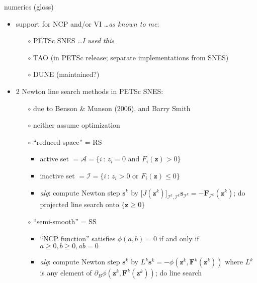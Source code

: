 \documentclass{beamer}
\newcommand\bq{\mathbf{q}}
\newcommand\bs{\mathbf{s}}
\newcommand\bx{\mathbf{x}}
\newcommand\bz{\mathbf{z}}
\newcommand\bF{\mathbf{F}}
\newcommand\Div{\nabla\cdot}
\begin{document}
\begin{frame}{numerics (gloss)}

\begin{itemize}
\item support for NCP and/or VI \dots \emph{as known to me}:
  \begin{itemize}
  \item[$\circ$]  PETSc SNES \dots \emph{I used this}
  \item[$\circ$]  TAO (in PETSc release; separate implementations from SNES)
  \item[$\circ$]  DUNE (maintained?)
  \end{itemize}
\item 2 Newton line search methods in PETSc SNES:
  \begin{itemize}
  \item[$\circ$]  due to Benson \& Munson (2006), and Barry Smith
  \item[$\circ$]  neither assume optimization
  \item[$\circ$]  ``reduced-space'' = \alert{RS}
    \begin{itemize}
    \item active set $= \mathcal{A} = \{i \,:\, z_i = 0 \text{ and } F_i(\bz) > 0\}$
    \item inactive set $= \mathcal{I} = \{i \,:\, z_i > 0 \text{ or } F_i(\bz) \le 0\}$
    \item \emph{alg}: compute Newton step $\bs^k$ by $\big[J(\bz^k)\big]_{\mathcal{I}^k,\mathcal{I}^k} \bs_{\mathcal{I}^k} = - \bF_{\mathcal{I}^k}(\bz^k)$; do projected line search onto $\{\bz\ge 0\}$
    \end{itemize}
  \item[$\circ$]  ``semi-smooth'' = \alert{SS}
    \begin{itemize}
    \item ``NCP function'' satisfies $\phi(a,b)=0$ if and only if $a\ge 0,b\ge 0,ab=0$
    \item \emph{alg}: compute Newton step $\bs^k$ by $L^k \bs^k = - \phi(\bz^k,\bF^k(\bz^k))$ where $L^k$ is any element of $\partial_B \phi(\bz^k,\bF^k(\bz^k))$; do line search
    \end{itemize}
  \end{itemize}
\end{itemize}
\end{frame}


\end{document}
